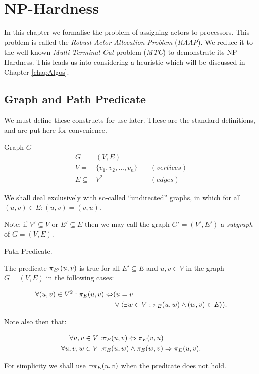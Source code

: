 \chapter{NP-Hardness}
\label{chapHardness}

In this chapter we formalise the problem of assigning actors to processors.
This problem is called the {\em Robust Actor Allocation Problem} ({\em RAAP}).
We reduce it to the well-known {\em Multi-Terminal Cut} problem ({\em MTC}) to demonstrate its NP-Hardness.
This leads us into considering a heuristic which will be discussed in Chapter \ref{chapAlgos}.

\section{Graph and Path Predicate}

We must define these constructs for use later.
These are the standard definitions, and are put here for convenience.

\begin{definition}
Graph $G$
\begin{align}
	\nonumber G = & (V,E) \\
	\nonumber V = & \{v_1, v_2, ..., v_n\} \quad & (vertices)\\
	\nonumber E \subseteq & V^2 & (edges)
\end{align}

We shall deal exclusively with so-called ``undirected'' graphs, in which for all $(u,v) \in E : (u,v) = (v,u)$.

Note: if $V' \subseteq V$ or $E' \subseteq E$ then we may call the graph $G'=(V',E')$ a \emph{subgraph} of $G=(V,E)$.
\end{definition}

\begin{definition}
\label{defHardPath}
Path Predicate.

The predicate $\pi_{E'}(u, v)$ is true for all $E' \subseteq E$ and $u, v \in V$ in the graph $G=(V,E)$ in the following cases:

\begin{align}
	\nonumber \forall (u,v) \in V^2 : \pi_{E}(u, v) \Leftrightarrow & ( u = v \\
	\nonumber & \vee \langle \exists w \in V : \pi_{E}(u, w) \wedge (w, v) \in E \rangle).
\end{align}

Note also then that:

\begin{align}
	\nonumber \forall u, v \in V: & \pi_{E}(u, v) \Leftrightarrow \pi_{E}(v, u) \\
	\nonumber \forall u, v, w \in V: & \pi_{E}(u, w) \wedge \pi_{E}(w, v) \Rightarrow \pi_{E}(u, v).
\end{align}

For simplicity we shall use $\neg\pi_{E}(u, v)$ when the predicate does not hold.

\end{definition}

